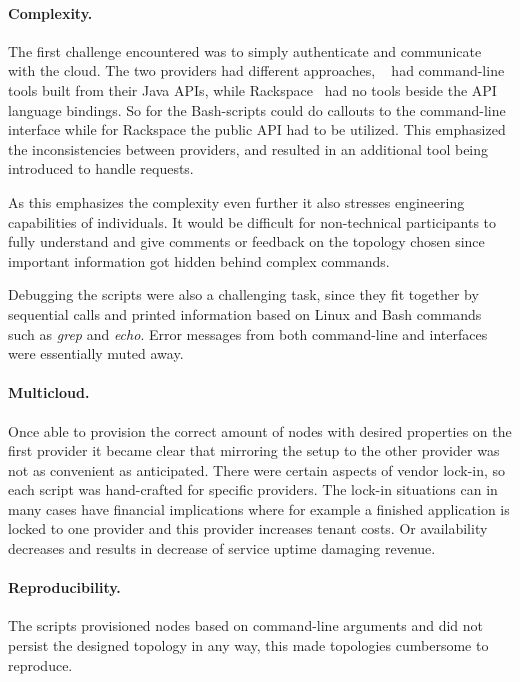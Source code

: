 \paragraph{Complexity.} 

The first challenge encountered was to simply 
authenticate and communicate with the cloud. 
The two providers had different approaches, ~\cite{aws} 
had command-line tools built from their Java APIs,
while Rackspace~\cite{rackspace} had no tools beside the API language bindings.
So for  the Bash-scripts could do callouts to the command-line interface 
while for Rackspace the public  API had to be utilized.
This emphasized the inconsistencies between providers, 
and resulted in an additional tool being introduced to handle requests.

As this emphasizes the complexity even further it also stresses engineering 
capabilities of individuals.
It would be difficult for non-technical participants to fully understand and give comments
or feedback on the topology chosen since important information got hidden behind
complex commands.

Debugging the scripts were also a challenging task, since they fit together by
sequential calls and printed information based on Linux and Bash commands such as \emph{grep} and \emph{echo}.
Error messages from both command-line and  interfaces were essentially muted away.

\paragraph{Multicloud.}

Once able to provision the correct amount of nodes with desired properties
on the first provider it became clear that mirroring the setup to the other provider 
was not as convenient as anticipated.
There were certain aspects of vendor lock-in, so each script was hand-crafted for specific providers.
The lock-in situations can in many cases have financial implications where for example
a finished application is locked to one provider and this provider increases tenant costs.
Or availability decreases and results in decrease of service uptime damaging revenue.

\paragraph{Reproducibility.}

The scripts provisioned nodes based on command-line arguments
and did not persist the designed topology in any way, this made topologies cumbersome to reproduce.

